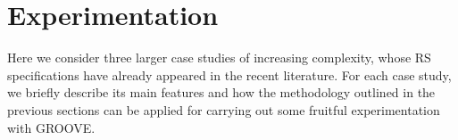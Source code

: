 
\section{Experimentation}\label{sec:experiments}

Here we consider three larger case studies of increasing complexity, whose RS specifications have already appeared in the recent literature. For each case study, we briefly describe its main features and how the methodology outlined in the previous sections can be applied for carrying out some fruitful experimentation with GROOVE.



